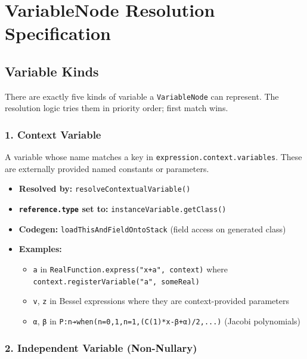 \documentclass[
]{article}
\author{}
\date{}
\providecommand{\tightlist}{%
  \setlength{\itemsep}{0pt}\setlength{\parskip}{0pt}}
\begin{document}
\section{VariableNode Resolution
Specification}\label{variablenode-resolution-specification}

\subsection{Variable Kinds}\label{variable-kinds}

There are exactly five kinds of variable a \texttt{VariableNode} can
represent. The resolution logic tries them in priority order; first
match wins.

\subsubsection{1. Context Variable}\label{context-variable}

A variable whose name matches a key in
\texttt{expression.context.variables}. These are externally provided
named constants or parameters.

\begin{itemize}
\tightlist
\item
  \textbf{Resolved by:} \texttt{resolveContextualVariable()}
\item
  \textbf{\texttt{reference.type} set to:}
  \texttt{instanceVariable.getClass()}
\item
  \textbf{Codegen:} \texttt{loadThisAndFieldOntoStack} (field access on
  generated class)
\item
  \textbf{Examples:}

  \begin{itemize}
  \tightlist
  \item
    \texttt{a} in \texttt{RealFunction.express("x+a",\ context)} where
    \texttt{context.registerVariable("a",\ someReal)}
  \item
    \texttt{v}, \texttt{z} in Bessel expressions where they are
    context-provided parameters
  \item
    \texttt{α}, \texttt{β} in
    \texttt{P:n➔when(n=0,1,n=1,(C(1)*x-β+α)/2,...)} (Jacobi polynomials)
  \end{itemize}
\end{itemize}

\subsubsection{2. Independent Variable
(Non-Nullary)}\label{independent-variable-non-nullary}
\end{document}
